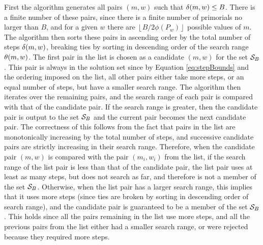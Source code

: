 \documentclass{ucalgthes1}
\theoremstyle{definition}
\newcommand{\floor}[1]{\left\lfloor #1 \right\rfloor}
\begin{document}
First the algorithm generates all pairs $(m, w)$ such that $\delta(m, w) \le B$.  There is a finite number of these pairs, since there is a finite number of primorials no larger than $B$, and for a given $w$ there are $\floor{B / 2\phi(P_w)}$ possible values of $m$.  The algorithm then sorts these pairs in ascending order by the total number of steps $\delta(m, w)$, breaking ties by sorting in descending order of the search range $\theta(m, w)$.  The first pair in the list is chosen as a candidate $(m, w)$ for the set $\mathcal S_B$.  This pair is always in the solution set since by Equation \ref{eq:stepBounds} and the ordering imposed on the list, all other pairs either take more steps, or an equal number of steps, but have a smaller search range.  The algorithm then iterates over the remaining pairs, and the search range of each pair is compared with that of the candidate pair.  If the search range is greater, then the candidate pair is output to the set $\mathcal S_B$ and the current pair becomes the next candidate pair.  The correctness of this follows from the fact that pairs in the list are monotonically increasing by the total number of steps, and successive candidate pairs are strictly increasing in their search range.  Therefore, when the candidate pair $(m, w)$ is compared with the pair $(m_i, w_i)$ from the list, if the search range of the list pair is less than that of the candidate pair, the list pair uses at least as many steps, but does not search as far, and therefore is not a member of the set $\mathcal S_B$.  Otherwise, when the list pair has a larger search range, this implies that it uses more steps (since ties are broken by sorting in descending order of search range), and the candidate pair is guaranteed to be a member of the set $\mathcal S_B$.  This holds since all the pairs remaining in the list use more steps, and all the previous pairs from the list either had a smaller search range, or were rejected because they required more steps.
\end{document}
